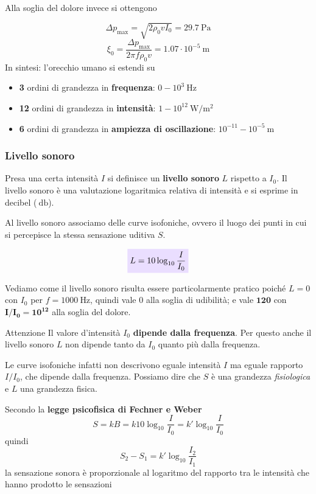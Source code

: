 \documentclass[x11names]{report}
\newcommand{\viola}[1]{\colorbox{yred}{$\displaystyle #1$}}
\begin{document}
	Alla soglia del dolore invece si ottengono 
	
	\[ 
	\Delta p_{\text{max}} = \sqrt{2\rho_0 v I_0} = 29.7 \SI{}{\pascal}
	\]
	\[ 
	\xi_0 = \frac{\Delta p_{\text{max}}}{2\pi f\rho_0 v} = 1.07 \cdot 10^{-5}\SI{}{\m}
	\]
	In sintesi: l'orecchio umano si estendi su
	\begin{itemize}
		\item \textbf{3} ordini di grandezza in \textbf{frequenza}: \(0 - 10^3 \SI{}{\hertz}\)
		\item \textbf{12} ordini di grandezza in \textbf{intensità}: \(1 - 10^12 \SI{}{\watt/\m^2}\)
		\item \textbf{6} ordini di grandezza in \textbf{ampiezza di oscillazione}: \(10^{-11} - 10^{-5} \SI{}{\m}\)
	\end{itemize}
	
	
	
	
	
	
	\subsubsection{Livello sonoro}
	Presa una certa intensità \(I\) si definisce un \textbf{livello sonoro} \(L\) rispetto a \(I_0\). Il livello sonoro è una valutazione logaritmica relativa di intensità e si esprime in decibel (\(\SI{}{\decibel}\)).
	
	Al livello sonoro associamo delle curve isofoniche, ovvero il luogo dei punti in cui si percepisce la stessa sensazione uditiva \(S\). 
	
	\vspace{0.2cm}
	\begin{equation}\label{livello sonoro}
		\viola{L = 10\log_{10}{\frac{I}{I_0}}}
	\end{equation}
	\vspace{0.2cm}
	
	Vediamo come il livello sonoro risulta essere particolarmente pratico poiché \(L = 0\) con \(I_0\) per \(f=1000\SI{}{\hertz}\), quindi vale 0 alla soglia di udibilità; e vale \(\boldsymbol{120}\) con \(\boldsymbol{I/I_0 = 10^{12}}\) alla soglia del dolore.
	
	\begin{es}{Attenzione}
		Il valore d'intensità \(I_0\) \textbf{dipende dalla frequenza}. Per questo anche il livello sonoro \(L\) non dipende tanto da \(I_0\) quanto più dalla frequenza. 
		
		Le curve isofoniche infatti non descrivono eguale intensità \(I\) ma eguale rapporto \(I/I_0\), che dipende dalla frequenza. Possiamo dire che \(S\) è una grandezza \textit{fisiologica} e \(L\) una grandezza fisica.
	\end{es}
	Secondo la \textbf{legge psicofisica di Fechner e Weber}
	\[ 
	S = kB = k10\log_10{\frac{I}{I_0}} = k'\log_10{\frac{I}{I_0}}
	\]
	quindi
	\begin{equation}
		S_2 - S_1 = k'\log_10{\frac{I_2}{I_1}}
	\end{equation}
	la sensazione sonora è proporzionale al logaritmo del rapporto tra le intensità che hanno prodotto le sensazioni
	
\end{document}
